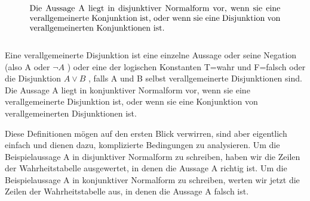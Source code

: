 \documentclass[../Main.tex]{subfiles}
\begin{document}
\begin{equation}
    \parbox{30em}{Die Aussage A liegt in disjunktiver Normalform vor, wenn sie eine verallgemeinerte Konjunktion ist, oder wenn sie eine 
    Disjunktion von verallgemeinerten Konjunktionen ist. }
\end{equation}
\\
Eine verallgemeinerte Disjunktion ist eine einzelne Aussage oder seine Negation (also A oder \(\lnot A\) ) oder eine der logischen Konstanten T=wahr und F=falsch oder die Disjunktion \(A \lor B \) , falls A und B selbst verallgemeinerte Disjunktionen 
sind.
Die Aussage A liegt in konjunktiver Normalform vor, wenn sie eine verallgemeinerte Disjunktion ist, oder wenn sie eine
Konjunktion von verallgemeinerten Disjunktionen ist.

Diese Definitionen mögen auf den ersten Blick verwirren, sind aber eigentlich einfach und
dienen dazu, komplizierte Bedingungen zu analysieren. Um die Beispielaussage A in disjunktiver Normalform zu schreiben,
haben wir die Zeilen der Wahrheitstabelle ausgewertet, in denen die Aussage A richtig ist.
Um die Beispielaussage A in konjunktiver Normalform zu schreiben, werten wir jetzt die Zeilen der Wahrheitstabelle aus, in denen die
Aussage A falsch ist.
\end{document}

